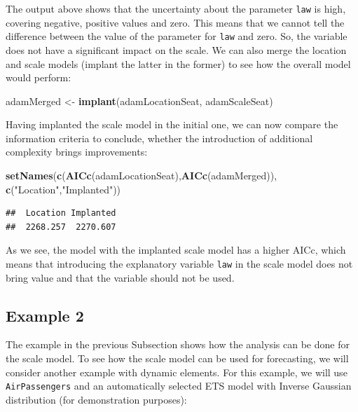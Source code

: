 \documentclass[]{book}
\newenvironment{Shaded}{\begin{snugshade}}{\end{snugshade}}
\newcommand{\KeywordTok}[1]{\textcolor[rgb]{0.13,0.29,0.53}{\textbf{#1}}}
\newcommand{\NormalTok}[1]{#1}
\newcommand{\StringTok}[1]{\textcolor[rgb]{0.31,0.60,0.02}{#1}}
\theoremstyle{definition}
\theoremstyle{definition}
\theoremstyle{definition}
\theoremstyle{definition}
\theoremstyle{remark}
\begin{document}
The output above shows that the uncertainty about the parameter \texttt{law} is high, covering negative, positive values and zero. This means that we cannot tell the difference between the value of the parameter for \texttt{law} and zero. So, the variable does not have a significant impact on the scale. We can also merge the location and scale models (implant the latter in the former) to see how the overall model would perform:

\begin{Shaded}
\begin{Highlighting}[]
\NormalTok{adamMerged <-}\StringTok{ }\KeywordTok{implant}\NormalTok{(adamLocationSeat, adamScaleSeat)}
\end{Highlighting}
\end{Shaded}

Having implanted the scale model in the initial one, we can now compare the information criteria to conclude, whether the introduction of additional complexity brings improvements:

\begin{Shaded}
\begin{Highlighting}[]
\KeywordTok{setNames}\NormalTok{(}\KeywordTok{c}\NormalTok{(}\KeywordTok{AICc}\NormalTok{(adamLocationSeat),}\KeywordTok{AICc}\NormalTok{(adamMerged)),}
         \KeywordTok{c}\NormalTok{(}\StringTok{"Location"}\NormalTok{,}\StringTok{"Implanted"}\NormalTok{))}
\end{Highlighting}
\end{Shaded}

\begin{verbatim}
##  Location Implanted 
##  2268.257  2270.607
\end{verbatim}

As we see, the model with the implanted scale model has a higher AICc, which means that introducing the explanatory variable \texttt{law} in the scale model does not bring value and that the variable should not be used.

\hypertarget{example-2}{%
\subsection{Example 2}\label{example-2}}

The example in the previous Subsection shows how the analysis can be done for the scale model. To see how the scale model can be used for forecasting, we will consider another example with dynamic elements. For this example, we will use \texttt{AirPassengers} and an automatically selected ETS model with Inverse Gaussian distribution (for demonstration purposes):
\end{document}
